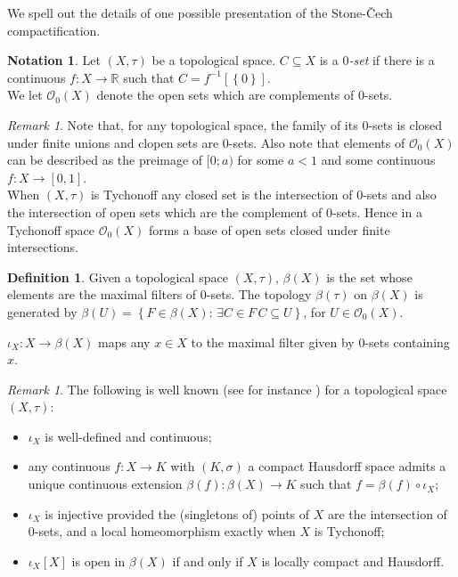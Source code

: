 \documentclass[11pt]{amsart}
\theoremstyle{plain}
\theoremstyle{definition}
\newtheorem{definition}[theorem]{Definition}
\newtheorem{notation}[theorem]{Notation}
\theoremstyle{plain}
\theoremstyle{remark}
\newtheorem{remark}[theorem]{Remark}
\newcommand{\bp}[1]{\left\lbrace #1 \right\rbrace}
\newcommand{\0}{\mathsf{0}}
\renewcommand{\1}{\mathsf{1}}
\renewcommand{\2}{\mathsf{2}}
\theoremstyle{definition}
\begin{document}
We spell out the details of one possible presentation of the Stone-\v{C}ech compactification.

\begin{notation}
Let $(X,\tau)$ be a topological space. $C\subseteq X$ is a \emph{$0$-set} if there is a continuous
 $f:X\to\mathbb{R}$ such that $C=f^{-1}[\bp{0}]$.\\ 
 We let $\mathcal{O}_0(X)$ denote the open sets which are complements of $0$-sets.
 \end{notation}
 
 \begin{remark}
Note that, for any topological space, the family of its $0$-sets is closed under finite unions and clopen sets are $0$-sets.
Also note that elements of $\mathcal{O}_0(X)$ can be described as the preimage of $[0;a)$
 for some $a<1$ and some continuous $f:X\to [0,1]$. \\
When $(X,\tau)$ is Tychonoff any closed set is the intersection of $0$-sets and also the intersection of open sets which are the complement of $0$-sets.
Hence in a Tychonoff space $\mathcal{O}_0(X)$ forms a base of open sets closed under finite intersections.
\end{remark}
 

\begin{definition}\label{def:stcechcomp}
Given a topological space $(X,\tau)$, $\beta(X)$ is the set whose elements are the maximal filters of $0$-sets. The topology $\beta(\tau)$ on $\beta(X)$ is generated by 
$\beta(U)=\bp{F\in\beta(X): \,\exists C\in F\, C\subseteq U}$, for $U\in\mathcal{O}_0(X)$.

$\iota_X:X\to\beta(X)$ maps any $x\in X$ to the maximal filter given by $0$-sets containing $x$.
\end{definition}

\begin{remark}\label{rmk:stcechcomp}
The following is well known (see for instance \cite[Appendix D.3]{viale-bookonforcing}) for a topological space $(X,\tau)$:

\begin{itemize}
\item
$\iota_X$ is well-defined and continuous;
\item any continuous $f:X\to K$ with $(K,\sigma)$ a compact Hausdorff space admits a unique continuous extension $\beta(f):\beta(X)\to K$ such that $f=\beta(f)\circ \iota_X$;
\item
$\iota_X$ is injective provided the (singletons of) points of $X$ are the intersection of $0$-sets, and a local homeomorphism exactly when $X$ is Tychonoff;  
\item $\iota_X[X]$ is open in $\beta(X)$ if and only if $X$ is locally compact and Hausdorff.
\end{itemize}
\end{remark}
\end{document}
